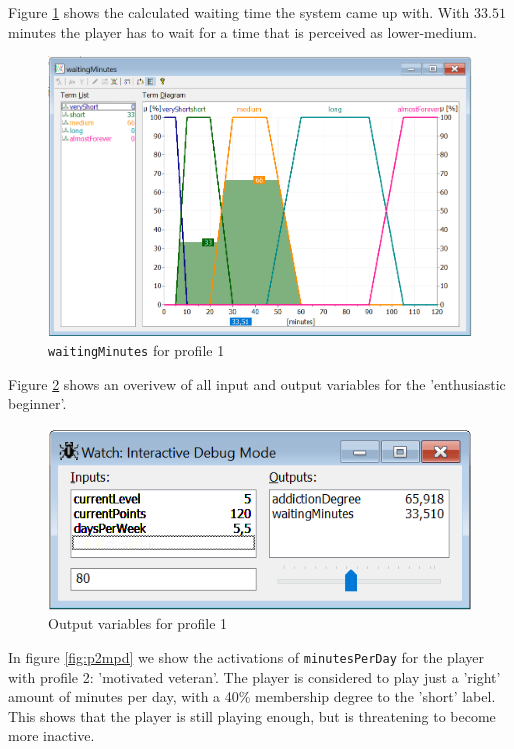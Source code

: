 Figure \ref{fig:p1wm} shows the calculated waiting time the system came up with. With $33.51$ minutes the player has to wait for a time that is perceived as lower-medium.

\begin{figure}[H]
\centering
\includegraphics[width=\textwidth]{img/profile1_vWaitingMinutes}
\caption{\texttt{waitingMinutes} for profile 1}
\label{fig:p1wm} 
\end{figure}

Figure \ref{fig:prof1} shows an overivew of all input and output variables for the 'enthusiastic beginner'.

\begin{figure}[H]
\centering
\includegraphics[width=\textwidth]{img/profile1}
\caption{Output variables for profile 1}
\label{fig:prof1} 
\end{figure}

In figure \ref{fig:p2mpd} we show the activations of \texttt{minutesPerDay} for the player with profile 2: 'motivated veteran'. The player is considered to play just a 'right' amount of minutes per day, with a 40\% membership degree to the 'short' label. This shows that the player is still playing enough, but is threatening to become more inactive.

